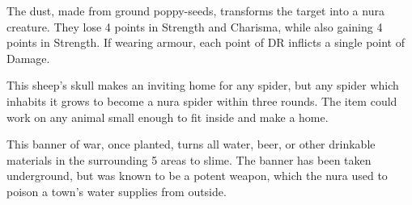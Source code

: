 \begin{multicols}{2}

\label{ogredust}

The dust, made from ground poppy-seeds, transforms the target into a nura creature.
They lose 4 points in Strength and Charisma, while also gaining 4 points in Strength.
If wearing armour, each point of DR inflicts a single point of Damage.

\label{spiderskull}

This sheep's skull makes an inviting home for any spider, but any spider which inhabits it grows to become a nura spider within three rounds.
The item could work on any animal small enough to fit inside and make a home.


This banner of war, once planted, turns all water, beer, or other drinkable materials in the surrounding 5 areas to slime.
The banner has been taken underground, but was known to be a potent weapon, which the nura used to poison a town's water supplies from outside.

\end{multicols}
